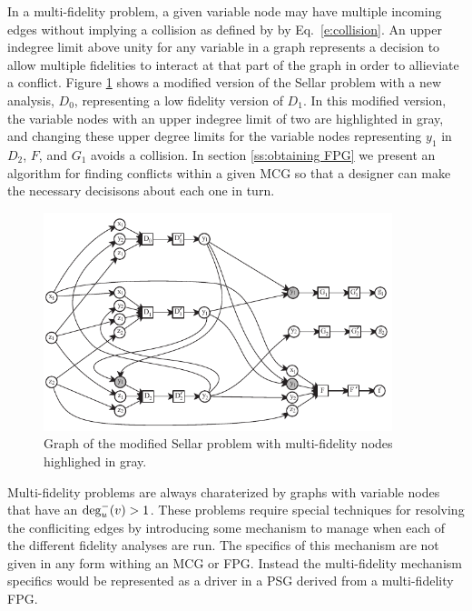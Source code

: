   In a multi-fidelity problem, a given variable node may have multiple incoming 
  edges without implying a collision as defined by by Eq.~\ref{e:collision}. 
An  upper indegree limit above unity for any variable in a graph represents a decision to 
  allow multiple fidelities to interact at that part of the graph in order to allieviate
  a conflict. 
  Figure \ref{f:collision_example} shows a modified version of the Sellar problem 
  with a new analysis, $D_0$, representing a low fidelity version of $D_1$. 
  In this modified version, the variable nodes with an upper indegree limit of two are highlighted in gray, and changing these upper degree limits for the variable nodes representing $y_1$ in $D_2$, $F$, and $G_1$ avoids a collision.
In section \ref{ss:obtaining FPG} we present an algorithm for finding 
  conflicts within a given MCG so that a designer can make the necessary decisisons about each 
  one in turn. 
  \begin{figure}
    \begin{center}
      \includegraphics[width=4in]{images/sellar_mulfi}
    \caption{Graph of the modified Sellar problem with multi-fidelity nodes highlighed in gray.\label{f:collision_example}}
  \end{center}
  \end{figure}

  Multi-fidelity problems are always charaterized by graphs with variable 
  nodes that have an $\textrm{deg}^-_u(v) > 1$. These problems require 
  special techniques for resolving the confliciting edges by introducing some mechanism
  to manage when each of the different fidelity analyses are 
  run\cite{march2012provably,alexandrov2001approximation,Huang_Allen_Notz_Miller_2006}.
  The specifics of this mechanism are not given in any form withing an MCG or 
  FPG. Instead the multi-fidelity mechanism specifics would be represented as a 
  driver in a PSG derived from a multi-fidelity FPG. 

